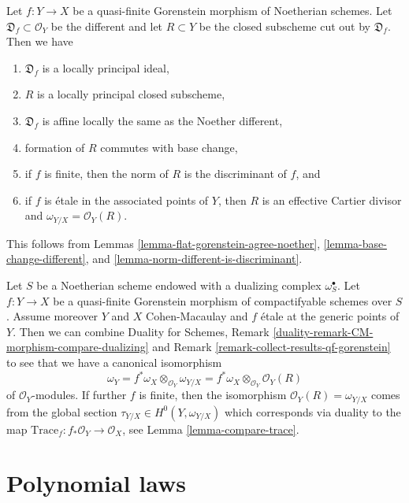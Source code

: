 \begin{remark}
\label{remark-collect-results-qf-gorenstein}
Let $f : Y \to X$ be a quasi-finite Gorenstein morphism of Noetherian schemes.
Let $\mathfrak D_f \subset \mathcal{O}_Y$ be the different and let
$R \subset Y$ be the closed subscheme cut out by $\mathfrak D_f$.
Then we have
\begin{enumerate}
\item $\mathfrak D_f$ is a locally principal ideal,
\item $R$ is a locally principal closed subscheme,
\item $\mathfrak D_f$ is affine locally the same as the Noether different,
\item formation of $R$ commutes with base change,
\item if $f$ is finite, then the norm of $R$ is the discriminant of $f$, and
\item if $f$ is \'etale in the associated points of $Y$, then
$R$ is an effective Cartier divisor and $\omega_{Y/X} = \mathcal{O}_Y(R)$.
\end{enumerate}
This follows from Lemmas \ref{lemma-flat-gorenstein-agree-noether},
\ref{lemma-base-change-different}, and
\ref{lemma-norm-different-is-discriminant}.
\end{remark}

\begin{remark}
\label{remark-collect-results-qf-gorenstein-two}
Let $S$ be a Noetherian scheme endowed with a dualizing complex
$\omega_S^\bullet$. Let $f : Y \to X$ be a quasi-finite Gorenstein
morphism of compactifyable schemes over $S$. Assume moreover
$Y$ and $X$ Cohen-Macaulay and $f$ \'etale at the generic
points of $Y$. Then we can combine
Duality for Schemes, Remark
\ref{duality-remark-CM-morphism-compare-dualizing} and
Remark \ref{remark-collect-results-qf-gorenstein}
to see that we have a canonical isomorphism
$$
\omega_Y = f^*\omega_X \otimes_{\mathcal{O}_Y} \omega_{Y/X} =
f^*\omega_X \otimes_{\mathcal{O}_Y} \mathcal{O}_Y(R)
$$
of $\mathcal{O}_Y$-modules. If further $f$ is finite,
then the isomorphism $\mathcal{O}_Y(R) = \omega_{Y/X}$ comes
from the global section $\tau_{Y/X} \in H^0(Y, \omega_{Y/X})$
which corresponds via duality to the map
$\text{Trace}_f : f_*\mathcal{O}_Y \to \mathcal{O}_X$, see
Lemma \ref{lemma-compare-trace}.
\end{remark}




\section{Polynomial laws}
\label{section-polynomial-laws}

